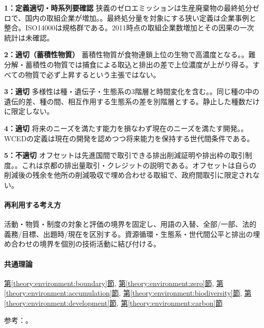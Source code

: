 \noindent\textbf{1：定義適切・時系列要確認} 狭義のゼロエミッションは生産廃棄物の最終処分ゼロで、国内の取組企業が増加。。最終処分量を対象にする狭い定義は企業事例と整合。ISO14000は規格群である。2011時点の取組企業数増加とその因果の一次統計は未確認。\par

\noindent\textbf{2：適切（蓄積性物質）} 蓄積性物質が食物連鎖上位の生物で高濃度となる。。難分解・蓄積性の物質では捕食による取込と排出の差で上位濃度が上がり得る。すべての物質で必ず上昇するという主張ではない。\par

\noindent\textbf{3：適切} 多様性は種・遺伝子・生態系の3階層と時間変化を含む。。同じ種の中の遺伝的差、種の間、相互作用する生態系の差を別階層とする。静止した種数だけに限定しない。\par

\noindent\textbf{4：適切} 将来のニーズを満たす能力を損なわず現在のニーズを満たす開発。。WCEDの定義は現在の開発を認めつつ将来能力を保持する世代間条件である。\par

\noindent\textbf{5：不適切} オフセットは先進国間で取引できる排出削減証明や排出枠の取引制度。。これは京都の排出量取引・クレジットの説明である。オフセットは自らの削減後の残余を他所の削減吸収で埋め合わせる取組で、政府間取引に限定されない。\par

\paragraph{再利用する考え方} 活動・物質・制度の対象と評価の境界を固定し、用語の入替、全部/一部、法的義務/目標、出題時/現在を区別する。資源循環・生態系・世代間公平と排出の埋め合わせの境界を個別の技術活動に結び付ける。

\paragraph{共通理論} \hyperref[theory:environment:boundary]{第\ref*{theory:environment:boundary}節}, \hyperref[theory:environment:zero]{第\ref*{theory:environment:zero}節}, \hyperref[theory:environment:accumulation]{第\ref*{theory:environment:accumulation}節}, \hyperref[theory:environment:biodiversity]{第\ref*{theory:environment:biodiversity}節}, \hyperref[theory:environment:development]{第\ref*{theory:environment:development}節}, \hyperref[theory:environment:carbon]{第\ref*{theory:environment:carbon}節}

\par 参考：\cite{env_zero2008,env_foodchain,env_biodiversity,env_development,env_offset2008}。

